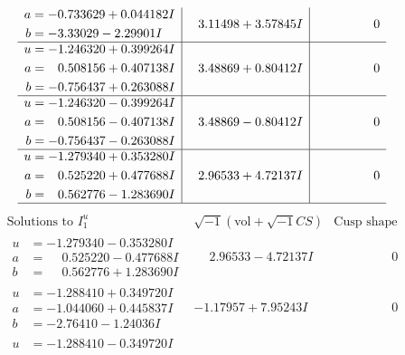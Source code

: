 \documentclass[1p]{elsarticle_modified}
\theoremstyle{definition}
\newcommand{\I}{\sqrt{-1}}
\begin{document}
$$\begin{array}{c|c|c}
\begin{aligned}
a &= -0.733629 + 0.044182 I \\
b &= -3.33029 - 2.29901 I\end{aligned}
 & \phantom{-}3.11498 + 3.57845 I & \phantom{-0.000000 } 0 \\ \hline\begin{aligned}
u &= -1.246320 + 0.399264 I \\
a &= \phantom{-}0.508156 + 0.407138 I \\
b &= -0.756437 + 0.263088 I\end{aligned}
 & \phantom{-}3.48869 + 0.80412 I & \phantom{-0.000000 } 0 \\ \hline\begin{aligned}
u &= -1.246320 - 0.399264 I \\
a &= \phantom{-}0.508156 - 0.407138 I \\
b &= -0.756437 - 0.263088 I\end{aligned}
 & \phantom{-}3.48869 - 0.80412 I & \phantom{-0.000000 } 0 \\ \hline\begin{aligned}
u &= -1.279340 + 0.353280 I \\
a &= \phantom{-}0.525220 + 0.477688 I \\
b &= \phantom{-}0.562776 - 1.283690 I\end{aligned}
 & \phantom{-}2.96533 + 4.72137 I & \phantom{-0.000000 } 0\\
 \hline 
 \end{array}$$\newpage$$\begin{array}{c|c|c}  
\text{Solutions to }I^u_{1}& \I (\text{vol} + \sqrt{-1}CS) & \text{Cusp shape}\\
 \hline 
\begin{aligned}
u &= -1.279340 - 0.353280 I \\
a &= \phantom{-}0.525220 - 0.477688 I \\
b &= \phantom{-}0.562776 + 1.283690 I\end{aligned}
 & \phantom{-}2.96533 - 4.72137 I & \phantom{-0.000000 } 0 \\ \hline\begin{aligned}
u &= -1.288410 + 0.349720 I \\
a &= -1.044060 + 0.445837 I \\
b &= -2.76410 - 1.24036 I\end{aligned}
 & -1.17957 + 7.95243 I & \phantom{-0.000000 } 0 \\ \hline\begin{aligned}
u &= -1.288410 - 0.349720 I \\

\end{aligned}
\end{array}$$
\end{document}
